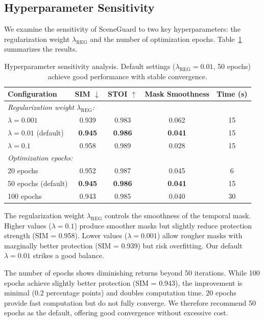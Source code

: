 \subsection{Hyperparameter Sensitivity}

We examine the sensitivity of SceneGuard to two key hyperparameters: the regularization weight $\lambda_{\text{REG}}$ and the number of optimization epochs. Table~\ref{tab:hyperparameter} summarizes the results.

\begin{table}[t]
\centering
\caption{Hyperparameter sensitivity analysis. Default settings ($\lambda_{\text{REG}} = 0.01$, 50 epochs) achieve good performance with stable convergence.}
\label{tab:hyperparameter}
\small
\begin{tabular}{lcccc}
\toprule
Configuration & SIM $\downarrow$ & STOI $\uparrow$ & Mask Smoothness & Time (s) \\
\midrule
\multicolumn{5}{l}{\textit{Regularization weight $\lambda_{\text{REG}}$:}} \\
$\lambda = 0.001$ & 0.939 & 0.983 & 0.062 & 15 \\
$\lambda = 0.01$ (default) & \textbf{0.945} & \textbf{0.986} & \textbf{0.041} & 15 \\
$\lambda = 0.1$ & 0.958 & 0.989 & 0.028 & 15 \\
\midrule
\multicolumn{5}{l}{\textit{Optimization epochs:}} \\
20 epochs & 0.952 & 0.987 & 0.045 & 6 \\
50 epochs (default) & \textbf{0.945} & \textbf{0.986} & \textbf{0.041} & 15 \\
100 epochs & 0.943 & 0.985 & 0.040 & 30 \\
\bottomrule
\end{tabular}
\end{table}

The regularization weight $\lambda_{\text{REG}}$ controls the smoothness of the temporal mask. Higher values ($\lambda = 0.1$) produce smoother masks but slightly reduce protection strength (SIM = 0.958). Lower values ($\lambda = 0.001$) allow rougher masks with marginally better protection (SIM = 0.939) but risk overfitting. Our default $\lambda = 0.01$ strikes a good balance.

The number of epochs shows diminishing returns beyond 50 iterations. While 100 epochs achieve slightly better protection (SIM = 0.943), the improvement is minimal (0.2 percentage points) and doubles computation time. 20 epochs provide fast computation but do not fully converge. We therefore recommend 50 epochs as the default, offering good convergence without excessive cost.


